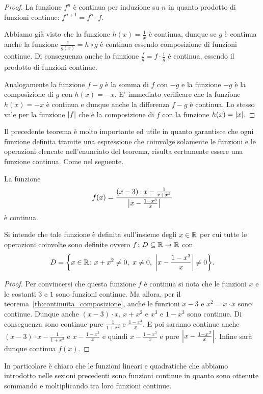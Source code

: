 \begin{proof}
  La funzione $f^n$ è continua per induzione su $n$
  in quanto prodotto di funzioni
  continue: $f^{n+1} = f^{n} \cdot f$.
  
  Abbiamo già visto che la funzione $h(x) = \frac{1}{x}$ è continua,
  dunque se $g$ è continua anche la funzione $\frac{1}{g(x)} = h\circ g$
  è continua essendo composizione di funzioni continue. 
  Di conseguenza anche la funzione $\frac{f}{g} = f \cdot \frac{1}{g}$
  è continua, essendo il prodotto di funzioni continue.
  
  Analogamente la funzione $f-g$ è la somma di $f$ con $-g$ e
  la funzione $-g$ è la composizione di $g$ con $h(x)=-x$.
  E' immediato verificare che la funzione $h(x)=-x$ è continua
  e dunque anche la differenza $f-g$ è continua.
  Lo stesso vale per la funzione ${\left|f\right|}$ che è la composizione
  di $f$ con la funzione $h(x) = {\left|x\right|}$.
  \end{proof}
  
  Il precedente teorema è molto importante ed utile in quanto
  garantisce che ogni funzione definita tramite una espressione
  che coinvolge solamente le funzioni e le operazioni
  elencate nell'enunciato del teorema, risulta certamente
  essere una funzione continua. Come nel seguente.
  
  \begin{example}
  La funzione
  \[
  f(x) = \frac{(x-3)\cdot x -\frac{1}{x+x^2}}{{\left|x-\frac{1-x^3}{x}\right|}}
  \]
  è continua.
  
  Si intende che tale funzione è definita sull'insieme degli $x\in {\mathbb R}$
  per cui tutte le operazioni coinvolte sono definite ovvero
  $f\colon D \subseteq {\mathbb R} \to {\mathbb R}$
  con
  \[
    D = \ENCLOSE{x\in \RR \colon x+x^2 \neq 0,\ x\neq 0,\ \abs{x-\frac{1-x^3}{x}}\neq 0}.
  \]
  \end{example}
  \begin{proof}
  Per convincersi che questa funzione $f$ è continua
  si nota che le funzioni $x$ e le costanti $3$ e $1$ sono
  funzioni continue.
  Ma allora, per il teorema~\ref{th:continuita_composizione},
  anche le funzioni $x-3$ e $x^2=x\cdot x$ sono continue.
  Dunque anche $(x-3)\cdot x$, $x+x^2$ e $x^3$ e $1-x^3$ sono continue.
  Di conseguenza sono continue pure $\frac 1{1+x^2}$ e $\frac{1-x^3}{x}$.
  E poi saranno continue anche $(x-3)\cdot x - \frac 1{1+x^2}$ e $x-\frac{1-x^3}{x}$
  e quindi $x-\frac{1-x^3}{x}$ e pure ${\left|x-\frac{1-x^3}{x}\right|}$. Infine sarà
  dunque continua $f(x)$.
  \end{proof}
  
  In particolare è chiaro che le funzioni lineari e quadratiche 
  che abbiamo introdotto nelle sezioni precedenti sono funzioni continue
  in quanto sono ottenute sommando e moltiplicando tra loro funzioni continue.
  
